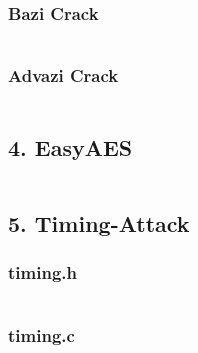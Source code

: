 \documentclass[10pt,a4paper]{article}
\begin{document}
\subsubsection*{Bazi Crack}
\inputminted{python}{crack_bazi.py}

\newpage

\subsubsection*{Advazi Crack}
\inputminted{python}{crack_advazi.py}

\newpage

\subsection{4. EasyAES}
\inputminted{C}{EasyAES/mitm.c}

\subsection{5. Timing-Attack}
\subsubsection*{timing.h}
\inputminted{C}{timingAngriff/timing.h}

\subsubsection*{timing.c}
\inputminted{C}{timingAngriff/timing.c}
\end{document}
